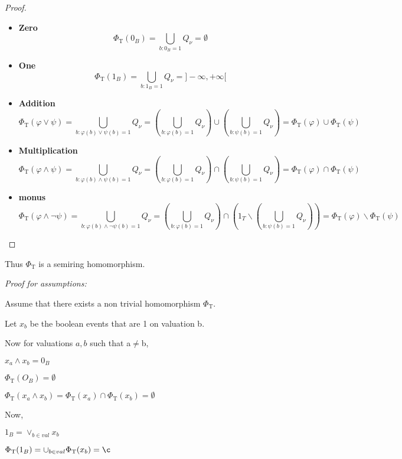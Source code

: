 \begin{proof}
\begin{itemize}
\item \textbf{Zero}
$$
\Phi_{\mathrm{T}}(0_B) = \bigcup_{b:0_B=1} Q_{\nu} = \emptyset
$$

\item
\textbf{One}
$$
\Phi_{\mathrm{T}}(1_B) = \bigcup_{b:1_B=1} Q_{\nu} = ]-\infty, +\infty[
$$
\item
\textbf{Addition}
$$
\Phi_{\mathrm{T}}(\varphi \lor \psi)
= \bigcup_{b: \varphi(b) \lor \psi(b) = 1} Q_{\nu}
= \left(\bigcup_{b: \varphi(b) = 1} Q_{\nu}\right) \cup \left(\bigcup_{b: \psi(b) = 1} Q_{\nu}\right)
= \Phi_{\mathrm{T}}(\varphi) \cup \Phi_{\mathrm{T}}(\psi)
$$
\item
\textbf{Multiplication}
$$
\Phi_{\mathrm{T}}(\varphi \land \psi)
= \bigcup_{b: \varphi(b) \land \psi(b) = 1} Q_{\nu}
= \left(\bigcup_{b: \varphi(b) = 1} Q_{\nu}\right) \cap \left(\bigcup_{b: \psi(b) = 1} Q_{\nu}\right)
= \Phi_{\mathrm{T}}(\varphi) \cap \Phi_{\mathrm{T}}(\psi)
$$
\item
\textbf{monus}
$$
\Phi_{\mathrm{T}}(\varphi \land \neg \psi)
= \bigcup_{b: \varphi(b) \land \neg \psi(b) = 1} Q_{\nu}
= \left(\bigcup_{b: \varphi(b) = 1} Q_{\nu}\right) \cap \left(1_T \backslash \left(\bigcup_{b: \psi(b) = 1} Q_{\nu}\right)\right)
= \Phi_{\mathrm{T}}(\varphi) \backslash \Phi_{\mathrm{T}}(\psi)
$$
    

\end{itemize}

\end{proof}

Thus $\Phi_{\mathrm{T}}$ is a semiring homomorphism.

\textit{Proof for assumptions:}

Assume that there exists a non trivial homomorphism $\Phi_{\mathrm{T}}$.

Let $x_b$ be the boolean events that are 1 on valuation b.

Now for valuations $a,b$ such that a$\neq$b,

$x_a \land x_b = 0_B$

$\Phi_{\mathrm{T}}(O_B)=\emptyset$

$\Phi_{\mathrm{T}}(x_a \land x_b)=\Phi_{\mathrm{T}}(x_a) \cap \Phi_{\mathrm{T}}(x_b) = \emptyset$

Now,

$1_B=\lor_{b\in val}x_b$

$\Phi_{\mathrm{T}}(1_B)=\cup_{b\in val}\Phi_{\mathrm{T}}(x_b)=\c$



